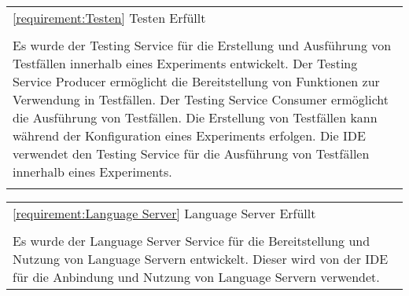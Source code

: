 \begin{tabularx}{\textwidth}{X}
    \toprule
    \autoref{requirement:Testen} \hfill Testen \hfill Erfüllt
    \\
    \\
    Es wurde der Testing Service für die Erstellung und Ausführung von Testfällen innerhalb eines Experiments entwickelt. Der Testing Service Producer ermöglicht die Bereitstellung von Funktionen zur Verwendung in Testfällen. Der Testing Service Consumer ermöglicht die Ausführung von Testfällen. Die Erstellung von Testfällen kann während der Konfiguration eines Experiments erfolgen. Die IDE verwendet den Testing Service für die Ausführung von Testfällen innerhalb eines Experiments.
    \\
    \bottomrule \\
\end{tabularx}
\begin{tabularx}{\textwidth}{X}
    \toprule
    \autoref{requirement:Language Server} \hfill Language Server \hfill Erfüllt
    \\
    \\
    Es wurde der Language Server Service für die Bereitstellung und Nutzung von Language Servern entwickelt. Dieser wird von der IDE für die Anbindung und Nutzung von Language Servern verwendet.
    \\
    \bottomrule
\end{tabularx}

